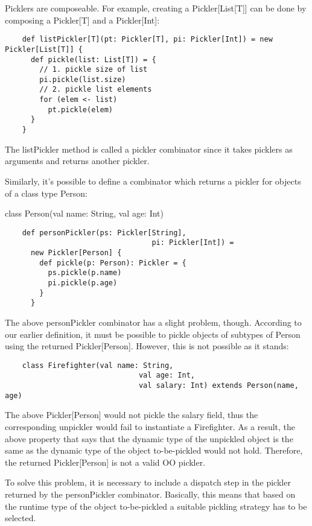 \documentclass[preprint,10pt]{sigplanconf}
\begin{document}
Picklers are composeable. For example, creating a Pickler[List[T]] can be done by composing a Pickler[T] and a Pickler[Int]:

\begin{verbatim}
    def listPickler[T](pt: Pickler[T], pi: Pickler[Int]) = new Pickler[List[T]] {
      def pickle(list: List[T]) = {
        // 1. pickle size of list
        pi.pickle(list.size)
        // 2. pickle list elements
        for (elem <- list)
          pt.pickle(elem)
      }
    }
\end{verbatim}

The listPickler method is called a pickler combinator since it takes picklers as arguments and returns another pickler.

Similarly, it's possible to define a combinator which returns a pickler for objects of a class type Person:

    class Person(val name: String, val age: Int)

\begin{verbatim}
    def personPickler(ps: Pickler[String],
                                  pi: Pickler[Int]) =
      new Pickler[Person] {
        def pickle(p: Person): Pickler = {
          ps.pickle(p.name)
          pi.pickle(p.age)
        }
      }
\end{verbatim}

The above personPickler combinator has a slight problem, though. According to our earlier definition, it must be possible to pickle objects of subtypes of Person using the returned Pickler[Person]. However, this is not possible as it stands:

\begin{verbatim}
    class Firefighter(val name: String,
                               val age: Int,
                               val salary: Int) extends Person(name, age)
\end{verbatim}

The above Pickler[Person] would not pickle the salary field, thus the corresponding unpickler would fail to instantiate a Firefighter. As a result, the above property that says that the dynamic type of the unpickled object is the same as the dynamic type of the object to-be-pickled would not hold. Therefore, the returned Pickler[Person] is not a valid OO pickler.

To solve this problem, it is necessary to include a dispatch step in the pickler returned by the personPickler combinator. Basically, this means that based on the runtime type of the object to-be-pickled a suitable pickling strategy has to be selected.
\end{document}
